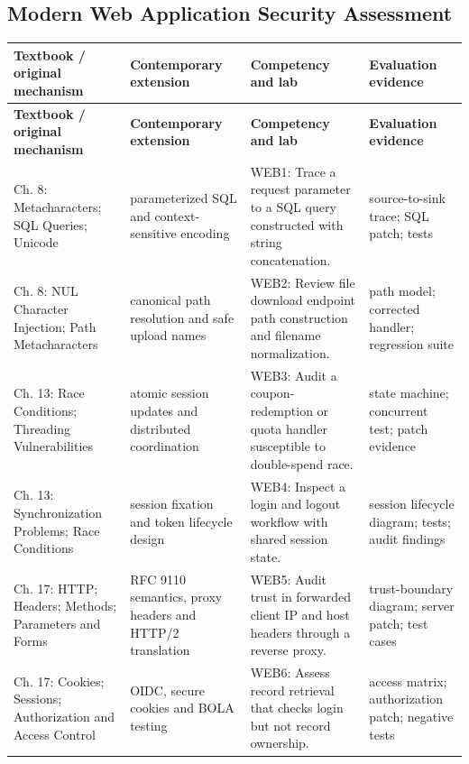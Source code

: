 \documentclass[10pt,letterpaper]{article}
\begin{document}
\subsection{Modern Web Application Security Assessment}
\begingroup\footnotesize\setlength\tabcolsep{3pt}
\begin{longtable}{>{\raggedright\arraybackslash}p{}>{\raggedright\arraybackslash}p{}>{\raggedright\arraybackslash}p{}>{\raggedright\arraybackslash}p{}}\toprule
\textbf{Textbook / original mechanism} & \textbf{Contemporary extension} & \textbf{Competency and lab} & \textbf{Evaluation evidence}\\\midrule\endfirsthead
\toprule \textbf{Textbook / original mechanism} & \textbf{Contemporary extension} & \textbf{Competency and lab} & \textbf{Evaluation evidence}\\\midrule\endhead
Ch. 8: Metacharacters; SQL Queries; Unicode & parameterized SQL and context-sensitive encoding & WEB1: Trace a request parameter to a SQL query constructed with string concatenation. & source-to-sink trace; SQL patch; tests\\\midrule
Ch. 8: NUL Character Injection; Path Metacharacters & canonical path resolution and safe upload names & WEB2: Review file download endpoint path construction and filename normalization. & path model; corrected handler; regression suite\\\midrule
Ch. 13: Race Conditions; Threading Vulnerabilities & atomic session updates and distributed coordination & WEB3: Audit a coupon-redemption or quota handler susceptible to double-spend race. & state machine; concurrent test; patch evidence\\\midrule
Ch. 13: Synchronization Problems; Race Conditions & session fixation and token lifecycle design & WEB4: Inspect a login and logout workflow with shared session state. & session lifecycle diagram; tests; audit findings\\\midrule
Ch. 17: HTTP; Headers; Methods; Parameters and Forms & RFC 9110 semantics, proxy headers and HTTP/2 translation & WEB5: Audit trust in forwarded client IP and host headers through a reverse proxy. & trust-boundary diagram; server patch; test cases\\\midrule
Ch. 17: Cookies; Sessions; Authorization and Access Control & OIDC, secure cookies and BOLA testing & WEB6: Assess record retrieval that checks login but not record ownership. & access matrix; authorization patch; negative tests\\\midrule

\end{longtable}
\end{document}

